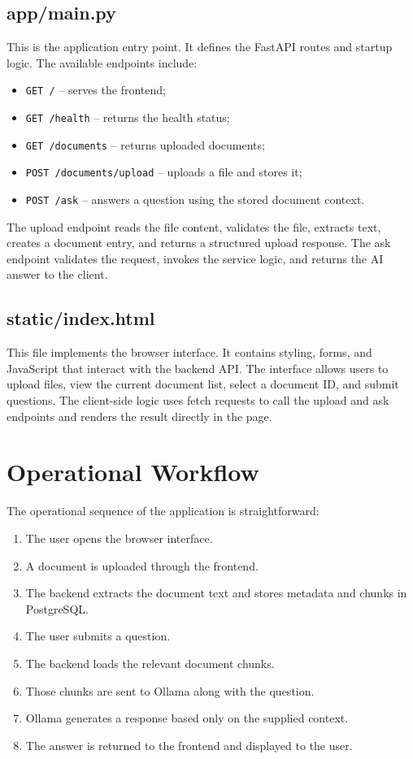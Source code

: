 ﻿\documentclass[11pt,a4paper]{article}
\begin{document}
\subsection{app/main.py}
This is the application entry point. It defines the FastAPI routes and startup logic. The available endpoints include:
\begin{itemize}[leftmargin=*]
    \item \texttt{GET /} -- serves the frontend;
    \item \texttt{GET /health} -- returns the health status;
    \item \texttt{GET /documents} -- returns uploaded documents;
    \item \texttt{POST /documents/upload} -- uploads a file and stores it;
    \item \texttt{POST /ask} -- answers a question using the stored document context.
\end{itemize}

The upload endpoint reads the file content, validates the file, extracts text, creates a document entry, and returns a structured upload response. The ask endpoint validates the request, invokes the service logic, and returns the AI answer to the client.

\subsection{static/index.html}
This file implements the browser interface. It contains styling, forms, and JavaScript that interact with the backend API. The interface allows users to upload files, view the current document list, select a document ID, and submit questions. The client-side logic uses fetch requests to call the upload and ask endpoints and renders the result directly in the page.

\section{Operational Workflow}
The operational sequence of the application is straightforward:
\begin{enumerate}[leftmargin=*]
    \item The user opens the browser interface.
    \item A document is uploaded through the frontend.
    \item The backend extracts the document text and stores metadata and chunks in PostgreSQL.
    \item The user submits a question.
    \item The backend loads the relevant document chunks.
    \item Those chunks are sent to Ollama along with the question.
    \item Ollama generates a response based only on the supplied context.
    \item The answer is returned to the frontend and displayed to the user.
\end{enumerate}
\end{document}
